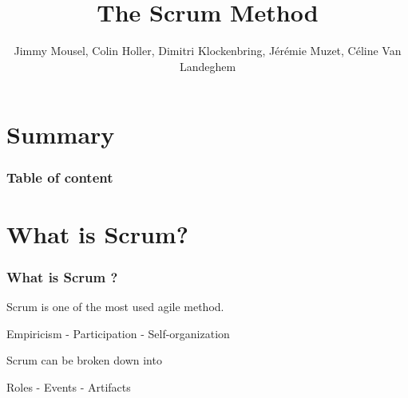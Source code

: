 \documentclass{beamer}
\title{The Scrum Method}
\author{Jimmy Mousel, Colin Holler, Dimitri Klockenbring, Jérémie Muzet, Céline Van Landeghem}
\date{}
\begin{document}
\frame{\titlepage}



\section{Summary}

\begin{frame}
    \frametitle{Table of content}
    \tableofcontents
\end{frame}



\section{What is Scrum?}

\begin{frame}
    \frametitle{What is Scrum ?}
    \begin{block}
         Scrum is one of the most used agile method.
        \begin{center}
             Empiricism  - Participation  - Self-organization
        \end{center}
    \end{block}
    \pause
    \begin{block}
         Scrum can be broken down into
        \begin{center}
             Roles  - Events  - Artifacts
        \end{center}
    \end{block}
\end{frame}
\end{document}
